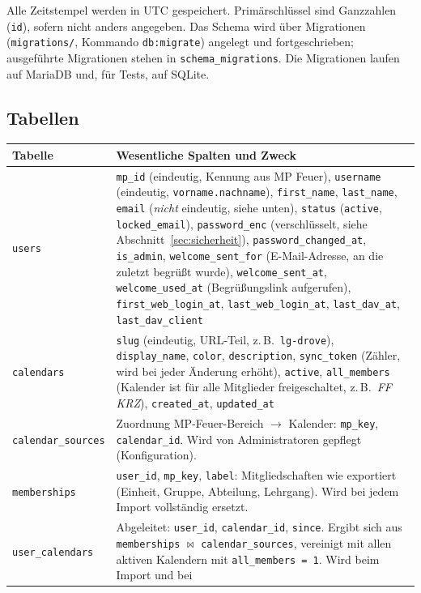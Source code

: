\documentclass[a4paper,fontsize=10pt]{scrartcl}
\newcommand{\code}[1]{\texttt{#1}}
\begin{document}
Alle Zeitstempel werden in UTC gespeichert. Primärschlüssel sind
Ganzzahlen (\code{id}), sofern nicht anders angegeben. Das Schema wird über
Migrationen (\code{migrations/}, Kommando \code{db:migrate}) angelegt und
fortgeschrieben; ausgeführte Migrationen stehen in
\code{schema\_migrations}. Die Migrationen laufen auf MariaDB und, für Tests,
auf SQLite.

\subsection*{Tabellen}

\begin{longtable}{L{3.2cm}L{11.6cm}}
\toprule
\textbf{Tabelle} & \textbf{Wesentliche Spalten und Zweck} \\
\midrule
\endhead
\code{users} &
\code{mp\_id} (eindeutig, Kennung aus MP Feuer), \code{username}
(eindeutig, \code{vorname.nachname}), \code{first\_name}, \code{last\_name},
\code{email} (\emph{nicht} eindeutig, siehe unten), \code{status}
(\code{active}, \code{locked\_email}),
\code{password\_enc} (verschlüsselt, siehe Abschnitt~\ref{sec:sicherheit}),
\code{password\_changed\_at}, \code{is\_admin}, \code{welcome\_sent\_for}
(E-Mail-Adresse, an die zuletzt begrüßt wurde), \code{welcome\_sent\_at},
\code{welcome\_used\_at} (Begrüßungslink aufgerufen),
\code{first\_web\_login\_at}, \code{last\_web\_login\_at},
\code{last\_dav\_at}, \code{last\_dav\_client} \\
\addlinespace
\code{calendars} &
\code{slug} (eindeutig, URL-Teil, z.\,B.\ \code{lg-drove}),
\code{display\_name}, \code{color}, \code{description}, \code{sync\_token}
(Zähler, wird bei jeder Änderung erhöht), \code{active},
\code{all\_members} (Kalender ist für alle Mitglieder freigeschaltet,
z.\,B.\ \emph{FF KRZ}), \code{created\_at}, \code{updated\_at} \\
\addlinespace
\code{calendar\_sources} &
Zuordnung MP-Feuer-Bereich $\rightarrow$ Kalender: \code{mp\_key},
\code{calendar\_id}. Wird von Administratoren gepflegt (Konfiguration). \\
\addlinespace
\code{memberships} &
\code{user\_id}, \code{mp\_key}, \code{label}: Mitgliedschaften wie
exportiert (Einheit, Gruppe, Abteilung, Lehrgang). Wird bei jedem Import
vollständig ersetzt. \\
\addlinespace
\code{user\_calendars} &
Abgeleitet: \code{user\_id}, \code{calendar\_id}, \code{since}. Ergibt sich
aus \code{memberships} $\bowtie$ \code{calendar\_sources}, vereinigt mit
allen aktiven Kalendern mit \code{all\_members = 1}. Wird beim Import und bei

\end{longtable}
\end{document}
